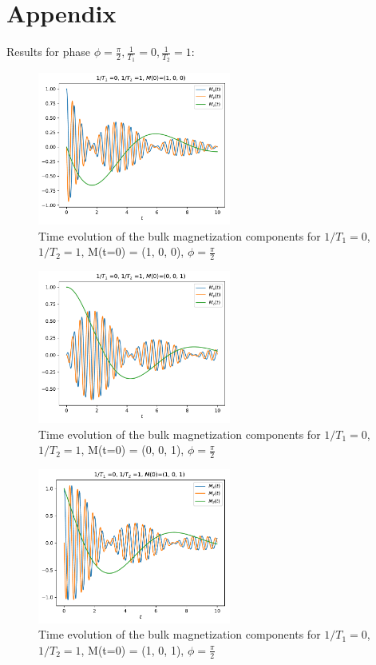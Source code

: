 \documentclass[journal]{IEEEtran} %
\begin{document}
\section*{Appendix}
Results for phase $\phi = \frac{\pi}{2}, \frac{1}{T_1} = 0, \frac{1}{T_2} = 1$:
\begin{figure}[H]
\centering
\includegraphics[width=2.5in]{figs/NMR_T1-0_T2-1_Minit-100_tau_0.01_t_10_phase_pi_2.pdf}
\caption{Time evolution of the bulk magnetization components for $1/T_1 = 0$, $1/T_2 = 1$, M(t=0) = (1, 0, 0), $\phi = \frac{\pi}{2}$}
\label{f10}
\end{figure}
\begin{figure}[H]
\centering
\includegraphics[width=2.5in]{figs/NMR_T1-0_T2-1_Minit-001_tau_0.01_t_10_phase_pi_2.pdf}
\caption{Time evolution of the bulk magnetization components for $1/T_1 = 0$, $1/T_2 = 1$, M(t=0) = (0, 0, 1), $\phi = \frac{\pi}{2}$}
\label{f11}
\end{figure}
\begin{figure}[!htb]
\centering
\includegraphics[width=2.5in]{figs/NMR_T1-0_T2-1_Minit-101_tau_0.01_t_10_phase_pi_2.pdf}
\caption{Time evolution of the bulk magnetization components for $1/T_1 = 0$, $1/T_2 = 1$, M(t=0) = (1, 0, 1), $\phi = \frac{\pi}{2}$}
\label{f12}
\end{figure}
\newpage
\end{document}
